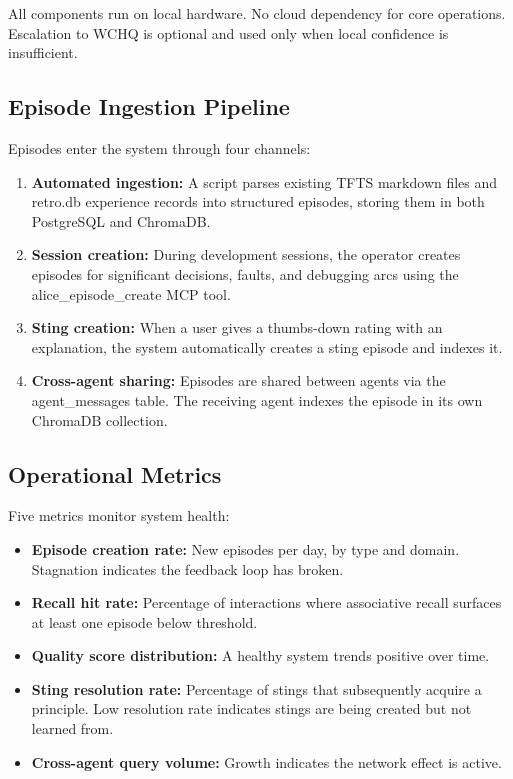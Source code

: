 \documentclass[11pt,a4paper]{article}
\begin{document}
All components run on local hardware. No cloud dependency for core operations. Escalation to WCHQ is optional and used only when local confidence is insufficient.

\subsection{Episode Ingestion Pipeline}

Episodes enter the system through four channels:

\begin{enumerate}
    \item \textbf{Automated ingestion:} A script parses existing TFTS markdown files and retro.db experience records into structured episodes, storing them in both PostgreSQL and ChromaDB.

    \item \textbf{Session creation:} During development sessions, the operator creates episodes for significant decisions, faults, and debugging arcs using the alice\_episode\_create MCP tool.

    \item \textbf{Sting creation:} When a user gives a thumbs-down rating with an explanation, the system automatically creates a sting episode and indexes it.

    \item \textbf{Cross-agent sharing:} Episodes are shared between agents via the agent\_messages table. The receiving agent indexes the episode in its own ChromaDB collection.
\end{enumerate}

\subsection{Operational Metrics}

Five metrics monitor system health:

\begin{itemize}
    \item \textbf{Episode creation rate:} New episodes per day, by type and domain. Stagnation indicates the feedback loop has broken.
    \item \textbf{Recall hit rate:} Percentage of interactions where associative recall surfaces at least one episode below threshold.
    \item \textbf{Quality score distribution:} A healthy system trends positive over time.
    \item \textbf{Sting resolution rate:} Percentage of stings that subsequently acquire a principle. Low resolution rate indicates stings are being created but not learned from.
    \item \textbf{Cross-agent query volume:} Growth indicates the network effect is active.
\end{itemize}
\end{document}
